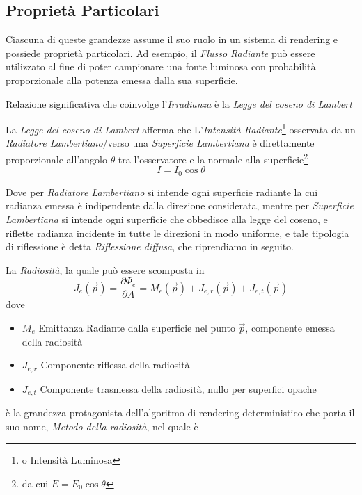 \subsection{Propriet\`a Particolari}
Ciascuna di queste grandezze assume il suo ruolo in un sistema di rendering e possiede propriet\`a particolari. Ad esempio, il \textit{Flusso Radiante}
pu\`o essere utilizzato al fine di poter campionare una fonte luminosa con probabilit\`a proporzionale alla potenza emessa dalla sua superficie.\par
Relazione significativa che coinvolge l'\textit{Irradianza} \`e la \textit{Legge del coseno di Lambert}
\begin{definitionS}
	La \textit{Legge del coseno di Lambert} afferma che L'\textit{Intensit\`a Radiante}\footnote{o Intensit\`a Luminosa} osservata da un 
	\textit{Radiatore Lambertiano}/verso una \textit{Superficie Lambertiana} \`e direttamente proporzionale all'angolo $\theta$ tra l'osservatore e la
	normale alla superficie\footnote{da cui $E = E_0\cos\theta$}
	\begin{equation*}
		I = I_0\cos\theta
	\end{equation*}
\end{definitionS}
Dove per \textit{Radiatore Lambertiano} si intende ogni superficie radiante la cui radianza emessa \`e indipendente dalla direzione considerata, mentre
per \textit{Superficie Lambertiana} si intende ogni superficie che obbedisce alla legge del coseno, e riflette radianza incidente in tutte le direzioni
in modo uniforme, e tale tipologia di riflessione \`e detta \textit{Riflessione diffusa}, che riprendiamo in seguito.\par 
La \textit{Radiosit\`a}, la quale pu\`o essere scomposta in 
\begin{equation*}
	J_e(\vec{p}) = \frac{\partial \Phi_e}{\partial A} = M_e(\vec{p}) + J_{e,r}(\vec{p}) + J_{e,t}(\vec{p})
\end{equation*}
dove 
\begin{itemize}[topsep=0pt, noitemsep]
	\item $M_e$ Emittanza Radiante dalla superficie nel punto $\vec{p}$, componente emessa della radiosit\`a
	\item $J_{e,r}$ Componente riflessa della radiosit\`a
	\item $J_{e,t}$ Componente trasmessa della radiosit\`a, nullo per superfici opache
\end{itemize}
\`e la grandezza protagonista dell'algoritmo di rendering deterministico che porta il suo nome, \textit{Metodo della radiosit\`a}, nel quale \`e 
